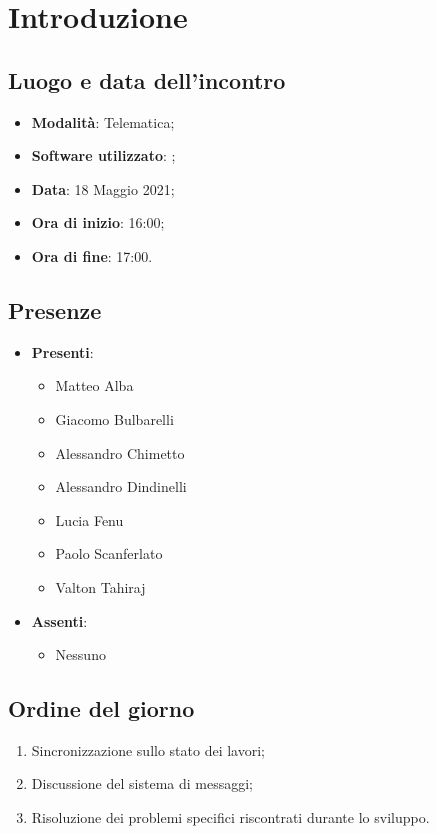 \documentclass[]{article}
\begin{document}
	

	\newpage


		\section{Introduzione}
		\subsection{Luogo e data dell'incontro}
		\begin{itemize}
			\item \textbf{Modalità}: Telematica;
			\item \textbf{Software utilizzato}: ;
			\item \textbf{Data}: 18 Maggio 2021;
			\item \textbf{Ora di inizio}: 16:00;
			\item \textbf{Ora di fine}: 17:00.
		\end{itemize}

		\subsection{Presenze}
		\begin{itemize}
			\item \textbf{Presenti}:
			\begin{itemize}
				\item Matteo Alba
				\item Giacomo Bulbarelli
				\item Alessandro Chimetto
				\item Alessandro Dindinelli
				\item Lucia Fenu
				\item Paolo Scanferlato
				\item Valton Tahiraj
			\end{itemize}
			\item \textbf{Assenti}:
			\begin{itemize}
				\item Nessuno
			\end{itemize}
		\end{itemize}


		\subsection{Ordine del giorno}
		\begin{enumerate}
			\item Sincronizzazione sullo stato dei lavori;
			\item Discussione del sistema di messaggi;
			\item Risoluzione dei problemi specifici riscontrati durante lo sviluppo.
		\end{enumerate}
\end{document}
